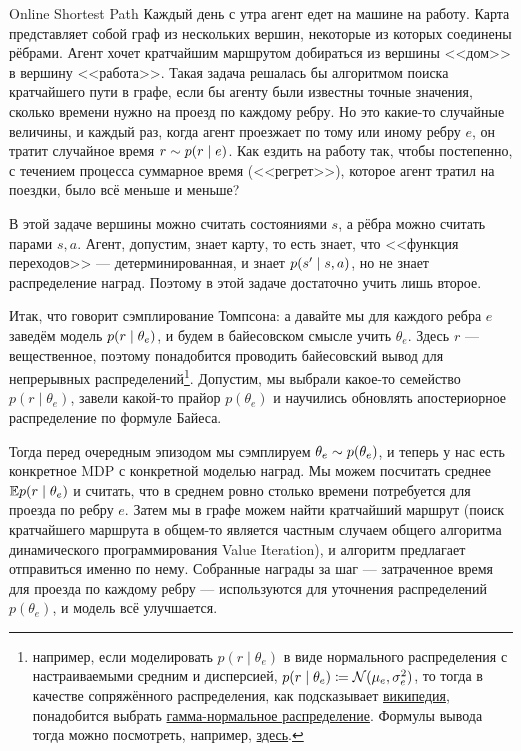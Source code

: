 \begin{exampleBox}[label=ex:onlineshortestpath]{Online Shortest Path}
Каждый день с утра агент едет на машине на работу. Карта представляет собой граф из нескольких вершин, некоторые из которых соединены рёбрами. Агент хочет кратчайшим маршрутом добираться из вершины <<дом>> в вершину <<работа>>. Такая задача решалась бы алгоритмом поиска кратчайшего пути в графе, если бы агенту были известны точные значения, сколько времени нужно на проезд по каждому ребру. Но это какие-то случайные величины, и каждый раз, когда агент проезжает по тому или иному ребру $e$, он тратит случайное время $r \HM \sim p(r \mid e)$. Как ездить на работу так, чтобы постепенно, с течением процесса суммарное время (<<регрет>>), которое агент тратил на поездки, было всё меньше и меньше?

В этой задаче вершины можно считать состояниями $s$, а рёбра можно считать парами $s, a$. Агент, допустим, знает карту, то есть знает, что <<функция переходов>> --- детерминированная, и знает $p(s' \HM \mid s, a)$, но не знает распределение наград. Поэтому в этой задаче достаточно учить лишь второе.

Итак, что говорит сэмплирование Томпсона: а давайте мы для каждого ребра $e$ заведём модель $p(r \HM \mid \theta_e)$, и будем в байесовском смысле учить $\theta_e$. Здесь $r$ --- вещественное, поэтому понадобится проводить байесовский вывод для непрерывных распределений\footnote{например, если моделировать $p(r \mid \theta_e)$ в виде нормального распределения с настраиваемыми средним и дисперсией, $p(r \mid \theta_e) \HM \coloneqq \N(\mu_e, \sigma^2_e)$, то тогда в качестве сопряжённого распределения, как подсказывает  \href{https://en.wikipedia.org/wiki/Conjugate_prior\#When_likelihood_function_is_a_continuous_distribution}{википедия}, понадобится выбрать \href{https://en.wikipedia.org/wiki/Normal-gamma_distribution}{гамма-нормальное распределение}. Формулы вывода тогда можно посмотреть, например, \href{https://en.wikipedia.org/wiki/Normal-gamma_distribution\#Posterior_distribution_of_the_parameters}{здесь}.}. Допустим, мы выбрали какое-то семейство $p(r \mid \theta_e)$, завели какой-то прайор $p(\theta_e)$ и научились обновлять апостериорное распределение по формуле Байеса. 

Тогда перед очередным эпизодом мы сэмплируем $\theta_e \HM\sim p(\theta_e)$, и теперь у нас есть конкретное MDP с конкретной моделью наград. Мы можем посчитать среднее $\mathbb{E} p(r \mid \theta_e)$ и считать, что в среднем ровно столько времени потребуется для проезда по ребру $e$. Затем мы в графе можем найти кратчайший маршрут (поиск кратчайшего маршрута в общем-то является частным случаем общего алгоритма динамического программирования Value Iteration), и алгоритм предлагает отправиться именно по нему. Собранные награды за шаг --- затраченное время для проезда по каждому ребру --- используются для уточнения распределений $p(\theta_e)$, и модель всё улучшается.
\end{exampleBox}